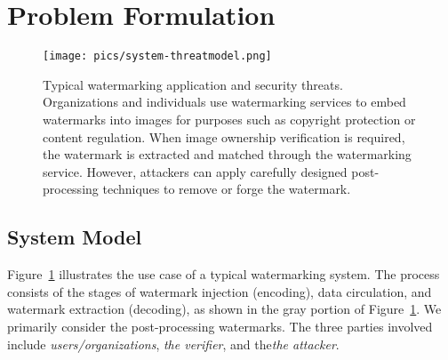 \section{Problem Formulation}

\begin{figure}[!t]
    \centering
    \texttt{[image: pics/system-threatmodel.png]} 
    
    \caption{Typical watermarking application and security threats. Organizations and individuals use watermarking services to embed watermarks into images for purposes such as copyright protection or content regulation. When image ownership verification is required, the watermark is extracted and matched through the watermarking service. However, attackers can apply carefully designed post-processing techniques to remove or forge the watermark.} 
    \label{fig:models}
\end{figure}

\subsection{System Model}
Figure~\ref{fig:models} illustrates the use case of a typical watermarking system. The process consists of the stages of watermark injection (encoding), data circulation, and watermark extraction (decoding), as shown in the gray portion of Figure~\ref{fig:models}. We primarily consider the post-processing watermarks. The three parties involved include \emph{users/organizations}, \emph{the verifier}, and the\emph{the attacker}.


